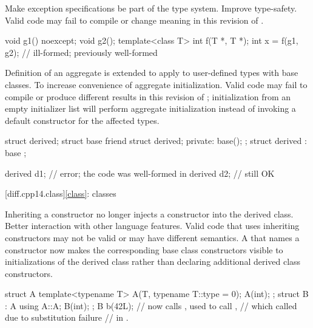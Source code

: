 \change
Make exception specifications be part of the type system.
\rationale
Improve type-safety.
\effect
Valid \CppXIV{} code may fail to compile or change meaning in this
revision of \Cpp{}.
\begin{example}
\begin{codeblock}
void g1() noexcept;
void g2();
template<class T> int f(T *, T *);
int x = f(g1, g2);              // ill-formed; previously well-formed
\end{codeblock}
\end{example}

\change
Definition of an aggregate is extended
to apply to user-defined types with base classes.
\rationale
To increase convenience of aggregate initialization.
\effect
Valid \CppXIV{} code may fail to compile or produce different results in this
revision of \Cpp{}; initialization from an empty initializer list will
perform aggregate initialization instead of invoking a default constructor
for the affected types.
\begin{example}
\begin{codeblock}
struct derived;
struct base {
  friend struct derived;
private:
  base();
};
struct derived : base {};

derived d1{};       // error; the code was well-formed in \CppXIV{}
derived d2;         // still OK
\end{codeblock}
\end{example}

[diff.cpp14.class]{\ref*{class}: classes}

\change
Inheriting a constructor no longer injects a constructor into the derived class.
\rationale
Better interaction with other language features.
\effect
Valid \CppXIV{} code that uses inheriting constructors may not be valid
or may have different semantics. A 
that names a constructor now makes the corresponding base class constructors
visible to initializations of the derived class
rather than declaring additional derived class constructors.
\begin{example}
\begin{codeblock}
struct A {
  template<typename T> A(T, typename T::type = 0);
  A(int);
};
struct B : A {
  using A::A;
  B(int);
};
B b(42L);           // now calls , used to call ,
                    // which called  due to substitution failure
                    // in .
\end{codeblock}
\end{example}


